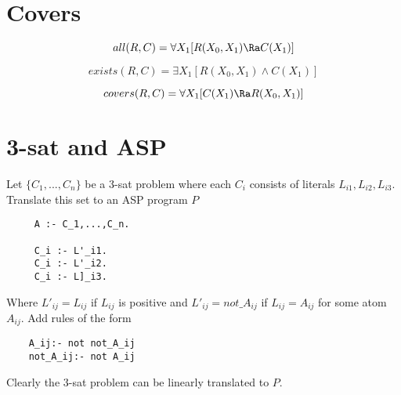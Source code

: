 \section{Covers}
\[ all(R,C) = \forall X_1 [R(X_0,X_1) \Ra C(X_1)] \]

\[ exists(R,C) = \exists X_1 [R(X_0,X_1) \wedge C(X_1)] \]

\[ covers(R,C) = \forall X_1 [C(X_1) \Ra R(X_0,X_1)] \]

\section{3-sat and ASP}

Let $\{C_1,...,C_n\}$ be a 3-sat problem where each $C_i$ consists of
literals $L_{i1},L_{i2},L_{i3}$.  Translate this set to an ASP program
$P$
%
\begin{verbatim}
     A :- C_1,...,C_n.

     C_i :- L'_i1.
     C_i :- L'_i2.
     C_i :- L]_i3.
\end{verbatim}

Where $L'_{ij} = L_{ij}$ if $L_{ij}$ is positive and $L'_{ij} =
not\_A_{ij}$ if $L_{ij} = A_{ij}$ for some atom $A_{ij}$.  Add rules of
the form 
\begin{verbatim}
    A_ij:- not not_A_ij
    not_A_ij:- not A_ij
\end{verbatim}
Clearly the 3-sat problem can be linearly translated to $P$.
